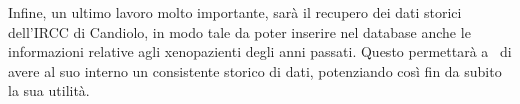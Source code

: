 Infine, un ultimo lavoro molto importante, sar\`a il recupero dei dati storici dell'IRCC di Candiolo, in modo tale da poter inserire nel database anche le informazioni relative agli xenopazienti degli anni passati. Questo permettar\`a a \Xeno\ di avere al suo interno un consistente storico di dati, potenziando cos\`i fin da subito la sua utilit\`a.